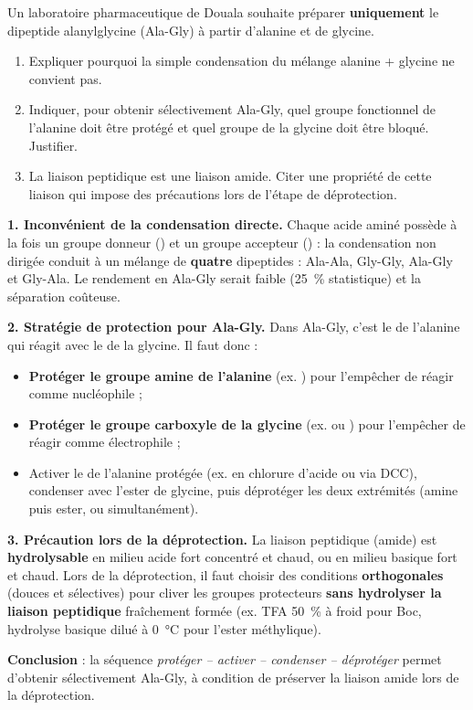 \documentclass[11pt]{article}
\begin{document}
\begin{exoresolu}
Un laboratoire pharmaceutique de Douala souhaite préparer \textbf{uniquement} le dipeptide alanylglycine (Ala-Gly) à partir d'alanine et de glycine.
\begin{enumerate}
\item Expliquer pourquoi la simple condensation du mélange alanine + glycine ne convient pas.
\item Indiquer, pour obtenir sélectivement Ala-Gly, quel groupe fonctionnel de l'alanine doit être protégé et quel groupe de la glycine doit être bloqué. Justifier.
\item La liaison peptidique est une liaison amide. Citer une propriété de cette liaison qui impose des précautions lors de l'étape de déprotection.
\end{enumerate}
\tcblower
\textbf{1. Inconvénient de la condensation directe.} Chaque acide aminé possède à la fois un groupe donneur () et un groupe accepteur () : la condensation non dirigée conduit à un mélange de \textbf{quatre} dipeptides : Ala-Ala, Gly-Gly, Ala-Gly et Gly-Ala. Le rendement en Ala-Gly serait faible (\SI{25}{\%} statistique) et la séparation coûteuse.

\textbf{2. Stratégie de protection pour Ala-Gly.} Dans Ala-Gly, c'est le  de l'alanine qui réagit avec le  de la glycine. Il faut donc :
\begin{itemize}
\item \textbf{Protéger le groupe amine  de l'alanine} (ex. ) pour l'empêcher de réagir comme nucléophile ;
\item \textbf{Protéger le groupe carboxyle  de la glycine} (ex.  ou ) pour l'empêcher de réagir comme électrophile ;
\item Activer le  de l'alanine protégée (ex. en chlorure d'acide ou via DCC), condenser avec l'ester de glycine, puis déprotéger les deux extrémités (amine puis ester, ou simultanément).
\end{itemize}

\textbf{3. Précaution lors de la déprotection.} La liaison peptidique (amide) est \textbf{hydrolysable} en milieu acide fort concentré et chaud, ou en milieu basique fort et chaud. Lors de la déprotection, il faut choisir des conditions \textbf{orthogonales} (douces et sélectives) pour cliver les groupes protecteurs \textbf{sans hydrolyser la liaison peptidique} fraîchement formée (ex. TFA \SI{50}{\%} à froid pour Boc, hydrolyse basique  dilué à \SI{0}{\celsius} pour l'ester méthylique).

\textbf{Conclusion} : la séquence \emph{protéger -- activer -- condenser -- déprotéger} permet d'obtenir sélectivement Ala-Gly, à condition de préserver la liaison amide lors de la déprotection.
\end{exoresolu}
\end{document}
